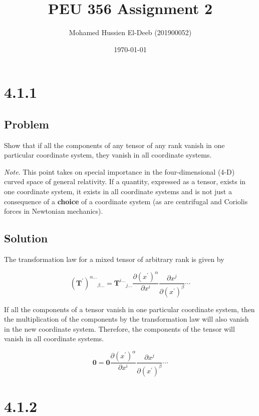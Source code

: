 \documentclass[12pt]{article}
\title{PEU 356 Assignment 2}
\author{Mohamed Hussien El-Deeb (201900052)}
\date{\today}
\begin{document}
\maketitle
\tableofcontents
\hypersetup{linkcolor=RoyalBlue4}

\newpage
\section{4.1.1}

\subsection{Problem}

Show that if all the components of any tensor of any rank vanish in one particular
coordinate system, they vanish in all coordinate systems.

\textit{Note}. This point takes on special importance in the four-dimensional (4-D) curved
space of general relativity. If a quantity, expressed as a tensor, exists in one coordinate
system, it exists in all coordinate systems and is not just a consequence of a \textbf{choice}
of a coordinate system (as are centrifugal and Coriolis forces in Newtonian mechanics).

\subsection{Solution}

The transformation law for a mixed tensor of arbitrary rank is given by

\[
    {\left(\textbf{T}^\prime\right)}^{\alpha \ldots}{ }_{\beta \ldots}
    = \textbf{T}^{i \ldots}{ }_{j \ldots}
    \frac{\partial {\left(x^\prime\right)}^\alpha}{\partial x^i}
    \frac{\partial x^j}{\partial {\left(x^\prime\right)}^\beta} \cdots
\]

If all the components of a tensor vanish in one particular coordinate system, then
the multiplication of the components by the transformation law will also vanish in
the new coordinate system. Therefore, the components of the tensor will vanish
in all coordinate systems.

\[
    \textbf{0} = \textbf{0}
    \frac{\partial {\left(x^\prime\right)}^\alpha}{\partial x^i}
    \frac{\partial x^j}{\partial {\left(x^\prime\right)}^\beta} \cdots
\]

\newpage
\section{4.1.2}
\end{document}
